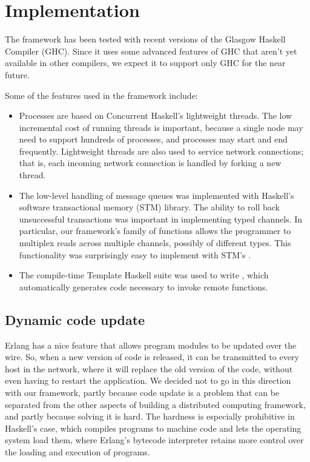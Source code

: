 \documentclass[preprint]{sigplanconf}
\begin{document}

\section{Implementation}
The framework has been tested with recent versions of the Glasgow Haskell Compiler (GHC). Since it uses some advanced features of GHC that aren't yet available in other compilers, we expect it to support only GHC for the near future.

Some of the features used in the framework include:

\begin{itemize}
\item Processes are based on Concurrent Haskell's lightweight threads. The low incremental cost of running threads is important, because a single node may need to support hundreds of processes, and processes may start and end frequently. Lightweight threads are also used to service network connections; that is, each incoming network connection is handled by forking a new thread.
\item The low-level handling of message queues was implemented with Haskell's software transactional memory (STM) library. The ability to roll back unsuccessful transactions was important in implementing typed channels. In particular, our framework's  family of functions allows the programmer to multiplex reads across multiple channels, possibly of different types. This functionality was surprisingly easy to implement with STM's .
\item The compile-time Template Haskell suite was used to write , which automatically generates code necessary to invoke remote functions.
\end{itemize}

\subsection{Dynamic code update} \label{s:code-update}

Erlang has a nice feature that allows program modules to be updated over the wire. So, when a new version of code is released, it can be transmitted to every host in the network, where it will replace the old version of the code, without even having to restart the application. We decided not to go in this direction with our framework, partly because code update is a problem that can be separated from the other aspects of building a distributed computing framework, and partly because solving it is hard. The hardness is especially prohibitive in Haskell's case, which compiles programs to machine code and lets the operating system load them, where Erlang's bytecode interpreter retains more control over the loading and execution of programs.
\end{document}
